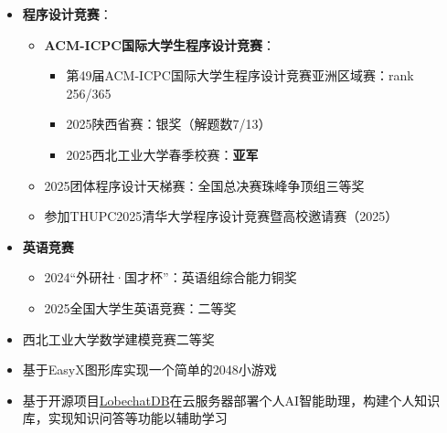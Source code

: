 \documentclass[zh]{resume}
\begin{document}
\begin{itemize}
  \item \textbf{程序设计竞赛}：
    \begin{itemize}
      \item \textbf{ACM-ICPC国际大学生程序设计竞赛}：
        \begin{itemize}
          \item 第49届ACM-ICPC国际大学生程序设计竞赛亚洲区域赛：rank 256/365
          \item 2025陕西省赛：银奖（解题数7/13）
          \item 2025西北工业大学春季校赛：\textbf{亚军}
        \end{itemize}
      \item 2025团体程序设计天梯赛：全国总决赛珠峰争顶组三等奖
      \item 参加THUPC2025清华大学程序设计竞赛暨高校邀请赛（2025）
    \end{itemize}
  \item \textbf{英语竞赛}
    \begin{itemize}
      \item 2024“外研社·国才杯”：英语组综合能力铜奖
      \item 2025全国大学生英语竞赛：二等奖
    \end{itemize}
  \item 西北工业大学数学建模竞赛二等奖
\end{itemize}

\begin{itemize}
  \item 基于EasyX图形库实现一个简单的2048小游戏
  \item 基于开源项目\href{https://github.com/lobehub/lobe-chat}{LobechatDB}在云服务器部署个人AI智能助理，构建个人知识库，实现知识问答等功能以辅助学习
\end{itemize}
\end{document}
